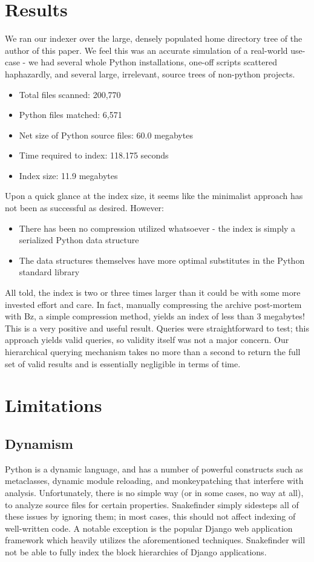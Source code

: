 \documentclass{article}
\begin{document}
\section{Results}

We ran our indexer over the large, densely populated home directory tree of the author of this paper. We feel this was an accurate simulation of a real-world use-case - we had several whole Python installations, one-off scripts scattered haphazardly, and several large, irrelevant, source trees of non-python projects.

\begin{itemize}
	\item Total files scanned: 200,770
	\item Python files matched: 6,571
	\item Net size of Python source files: 60.0 megabytes
	\item Time required to index: 118.175 seconds
	\item Index size: 11.9 megabytes
	\end{itemize}

Upon a quick glance at the index size, it seems like the minimalist approach has not been as successful as desired. However:
	\begin{itemize}
	\item There has been no compression utilized whatsoever - the index is simply a serialized Python data structure
	\item The data structures themselves have more optimal substitutes in the Python standard library
	\end{itemize}
	All told, the index is two or three times larger than it could be with some more invested effort and care. In fact, manually compressing the archive post-mortem with Bz, a simple compression method, yields an index of less than 3 megabytes! This is a very positive and useful result.
	Queries were straightforward to test; this approach yields valid queries, so validity itself was not a major concern.
	Our hierarchical querying mechanism takes no more than a second
	to return the full set of valid results and is essentially negligible in terms of time.

\section{Limitations}
\subsection{Dynamism}
Python is a dynamic language, and has a number of powerful constructs such as metaclasses, dynamic module reloading, and monkeypatching that interfere with analysis. Unfortunately, there is no simple way (or in some cases, no way at all), to analyze source files for certain properties. Snakefinder simply sidesteps all of these issues by ignoring them; in most cases, this should not affect indexing of well-written code.
A notable exception is the popular Django\cite{Django} web application framework which heavily utilizes the aforementioned techniques. Snakefinder will not be able to fully index the block hierarchies of Django applications.
\end{document}
